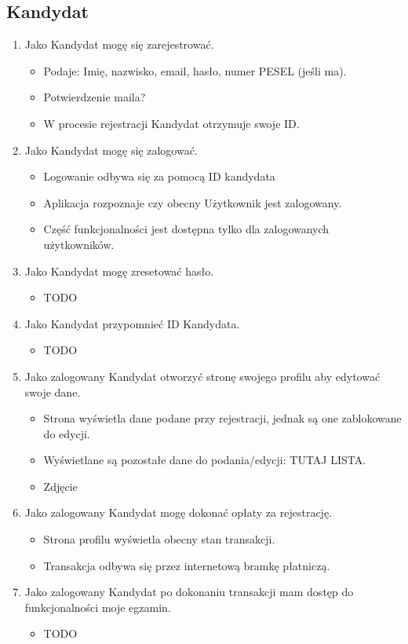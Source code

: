 \documentclass{article}
\begin{document}
\subsection{Kandydat}
\begin{enumerate}
    \item Jako Kandydat mogę się zarejestrować.   
        \begin{itemize}
        \item Podaje: Imię, nazwisko, email, hasło, numer PESEL (jeśli ma).
        \item Potwierdzenie maila?
        \item W procesie rejestracji Kandydat otrzymuje swoje ID. 
        \end{itemize}
    \item Jako Kandydat mogę się zalogować.   
        \begin{itemize}
        \item Logowanie odbywa się za pomocą ID kandydata
        \item Aplikacja rozpoznaje czy obecny Użytkownik jest zalogowany.
        \item Część funkcjonalności jest dostępna tylko dla zalogowanych użytkowników.
        \end{itemize}
    \item Jako Kandydat mogę zresetować hasło.   
        \begin{itemize}
        \item TODO
        \end{itemize}
    \item Jako Kandydat przypomnieć ID Kandydata.   
        \begin{itemize}
        \item TODO
        \end{itemize}
    \item Jako zalogowany Kandydat otworzyć stronę swojego profilu aby edytować swoje dane.   
        \begin{itemize}
        \item Strona wyświetla dane podane przy rejestracji, jednak są one zablokowane do edycji.
        \item Wyświetlane są pozostałe dane do podania/edycji: TUTAJ LISTA.
        \item Zdjęcie
        \end{itemize}
    \item Jako zalogowany Kandydat mogę dokonać opłaty za rejestrację.   
        \begin{itemize}
        \item Strona profilu wyświetla obecny stan transakcji.
        \item Transakcja odbywa się przez internetową bramkę płatniczą.
        \end{itemize}
    \item Jako zalogowany Kandydat po dokonaniu transakcji mam dostęp do funkcjonalności moje egzamin.   
        \begin{itemize}
        \item TODO
        \end{itemize}
\end{enumerate}
\end{document}
